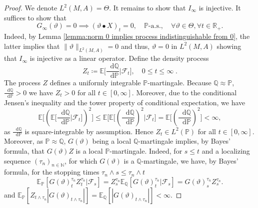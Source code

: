 \documentclass[11pt,a4paper,twoside,openany]{report}
\numberwithin{equation}{section}
\newcommand{\diff}{\mathop{}\!\mathrm{d}}
\theoremstyle{plain} %
\theoremstyle{definition} %
\theoremstyle{remark} %
\begin{document}
\begin{proof}
    We denote \(L^2(M,A)=\Theta\). It remains to show that \(I_{\infty}\) is injective. It suffices to show that 
    \begin{equation*}
        G_{\infty}(\vartheta)=0\implies (\vartheta\bullet X)_{t}=0,\quad\mathbb{P}\text{-a.s.},\quad\forall \vartheta\in\Theta,\forall t\in\mathbb{R}_+.
    \end{equation*}
 Indeed, by Lemma \ref{lemma:norm 0 implies process indistinguishable from 0}, the latter implies that \(\lVert\vartheta\rVert_{L^2(M,A)}=0\) and thus, \(\vartheta=0\) in \(L^2(M,A)\)
 showing that \(I_{\infty}\) is injective as a linear operator. Define the density process
    \begin{equation*}
        Z_t\coloneqq \mathbb{E}\bigg[\frac{\diff \mathbb{Q}}{\diff \mathbb{P}}|\mathcal{F}_t\bigg],\quad 0\leq t\leq \infty\;.
    \end{equation*}
    The process \(Z\) defines a uniformly integrable \(\mathbb{P}\)-martingale.
    Because \(\mathbb{Q}\approx \mathbb{P}\), \(\frac{\diff \mathbb{Q}}{\diff \mathbb{P}}>0\) we have \(Z_t>0\) for all \(t\in [0,\infty]\). Moreover, due to the conditional Jensen's inequality and the tower property of conditional expectation, we have 
    \begin{equation*}
        \mathbb{E}\bigg[\left(\mathbb{E}\bigg[\frac{\diff \mathbb{Q}}{\diff \mathbb{P}}\bigg|\mathcal{F}_t\bigg]\right)^2\bigg]\leq\mathbb{E}\bigg[\mathbb{E}\bigg[\left(\frac{\diff \mathbb{Q}}{\diff \mathbb{P}}\right)^2\bigg|\mathcal{F}_t\bigg]=\mathbb{E}\bigg[\left(\frac{\diff \mathbb{Q}}{\diff \mathbb{P}}\right)^2\bigg]<\infty,
    \end{equation*}
    as \(\frac{\diff \mathbb{Q}}{\diff \mathbb{P}}\) is square-integrable by assumption.
    Hence \(Z_t\in L^2(\mathbb{P})\) for all \(t\in[0,\infty]\). Moreover, as \(\mathbb{P}\approx\mathbb{Q}\), \(G(\vartheta)\) being a local \(\mathbb{Q}\)-martingale implies, by Bayes' formula, that \(G(\vartheta)Z\) is a local \(\mathbb{P}\)-martingale. Indeed, for \(s\leq t\) and a localizing sequence \((\tau_n)_{n\in\mathbb{N}}\), for which  \(G(\vartheta)\) is a \(\mathbb{Q}\)-martingale, we have, by Bayes' formula, for the stopping times \(\tau_n\wedge s\leq \tau_n\wedge t\)
    \begin{equation*}
        \mathbb{E}_{\mathbb{P}}[G(\vartheta)^{\tau_n}_{t}Z^{\tau_n}_{t}|\mathcal{F}_s]=Z^{\tau_n}_{s}\mathbb{E}_{\mathbb{Q}}[G(\vartheta)^{\tau_n}_{t}|\mathcal{F}_s]=G(\vartheta)^{\tau_n}_{s}Z^{\tau_n}_{s}.
    \end{equation*}
    and \(\mathbb{E}_{\mathbb{P}}[Z_{t\wedge\tau_n}|G(\vartheta)_{t\wedge\tau_n}|]=\mathbb{E}_{\mathbb{Q}}[|G(\vartheta)_{t\wedge\tau_n}|]<\infty\).


\end{proof}
\end{document}
